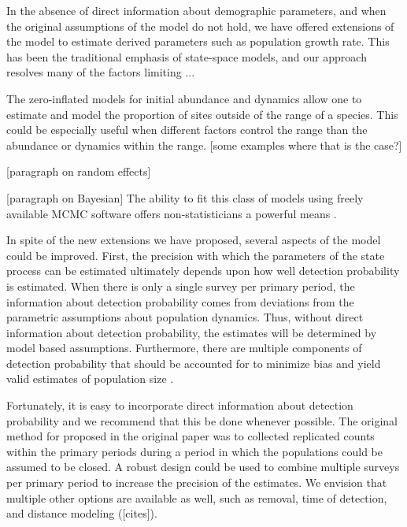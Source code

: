\documentclass[12pt]{article}
\begin{document}
In the absence of direct information about demographic parameters, and
when the original assumptions of the model do not hold, we have
offered extensions of the model to estimate derived parameters such as
population growth rate. This has been the traditional emphasis of
state-space models, and our approach resolves many of the factors
limiting ...

The zero-inflated models for initial
abundance and dynamics allow one to estimate and model the proportion
of sites outside of the range of a species.  This could be especially
useful when different factors control the range than the abundance or
dynamics within the range.  [some examples where that is the case?]

[paragraph on random effects]


[paragraph on Bayesian]
The ability to fit this class of models using freely available MCMC
software offers non-statisticians a powerful means .

In spite of the new extensions we have proposed, several aspects of
the model could be improved. First, the precision with which the
parameters of the state process can be estimated ultimately depends
upon how well detection probability is estimated. When there is only a
single survey per primary period, the information about detection
probability comes from deviations from the parametric assumptions
about population dynamics. Thus, without direct information about
detection probability, the estimates will be determined by model based
assumptions. Furthermore, there are multiple components of detection
probability that should be accounted for to minimize bias and yield
valid estimates of population size \citep{nichols_etal:2009}.

Fortunately, it is easy to incorporate direct information about
detection probability and we recommend that this be done whenever
possible. The original method for proposed in the original paper was
to collected replicated counts within the primary periods during a
period in which the populations could be assumed to be closed.  A
robust design could be used to combine multiple surveys per primary
period to increase the precision of the estimates. We envision that
multiple other options are available as well, such as removal, time of 
detection, and distance modeling ([cites]).
\end{document}
